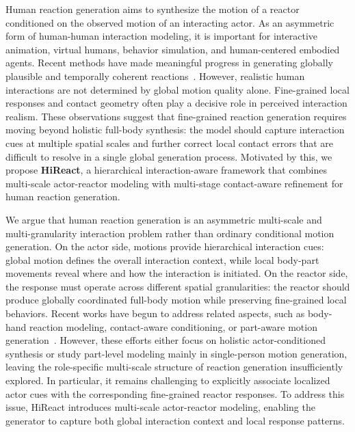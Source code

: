 \documentclass{article}
\begin{document}
Human reaction generation aims to synthesize the motion of a reactor conditioned on the observed motion of an interacting actor. As an asymmetric form of human-human interaction modeling, it is important for interactive animation, virtual humans, behavior simulation, and human-centered embodied agents. Recent methods have made meaningful progress in generating globally plausible and temporally coherent reactions~\citep{chopin2023interaction,xu2024regennet,ghosh2024remos}. However, realistic human interactions are not determined by global motion quality alone. Fine-grained local responses and contact geometry often play a decisive role in perceived interaction realism. These observations suggest that fine-grained reaction generation requires moving beyond holistic full-body synthesis: the model should capture interaction cues at multiple spatial scales and further correct local contact errors that are difficult to resolve in a single global generation process. Motivated by this, we propose \textbf{HiReact}, a hierarchical interaction-aware framework that combines multi-scale actor-reactor modeling with multi-stage contact-aware refinement for human reaction generation.

We argue that human reaction generation is an asymmetric multi-scale and multi-granularity interaction problem rather than ordinary conditional motion generation. On the actor side, motions provide hierarchical interaction cues: global motion defines the overall interaction context, while local body-part movements reveal where and how the interaction is initiated. On the reactor side, the response must operate across different spatial granularities: the reactor should produce globally coordinated full-body motion while preserving fine-grained local behaviors. Recent works have begun to address related aspects, such as body-hand reaction modeling, contact-aware conditioning, or part-aware motion generation~\citep{ghosh2024remos,zou2024parco,heo2026party,ghosh2021synthesis}. However, these efforts either focus on holistic actor-conditioned synthesis or study part-level modeling mainly in single-person motion generation, leaving the role-specific multi-scale structure of reaction generation insufficiently explored. In particular, it remains challenging to explicitly associate localized actor cues with the corresponding fine-grained reactor responses. To address this issue, HiReact introduces multi-scale actor-reactor modeling, enabling the generator to capture both global interaction context and local response patterns.
\end{document}
